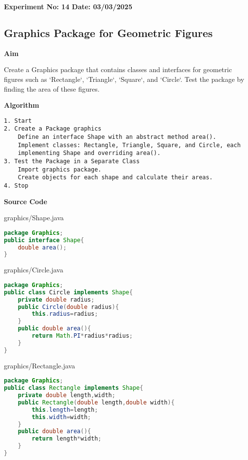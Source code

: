 \textbf{Experiment No: 14 \hfill Date: 03/03/2025}

\begin{center}
    \Large \subsection*{Graphics Package for Geometric Figures}
\end{center}

\textbf{Aim}
\vspace{0.5cm}

Create a Graphics package that contains classes and interfaces for geometric figures such as ‘Rectangle‘, ‘Triangle‘, ‘Square‘, and ‘Circle‘. Test the package by finding the area of these figures.

\vspace{0.5cm}
\textbf{Algorithm}
\vspace{0.5cm}
\begin{verbatim}
1. Start
2. Create a Package graphics
    Define an interface Shape with an abstract method area().
    Implement classes: Rectangle, Triangle, Square, and Circle, each 
    implementing Shape and overriding area().
3. Test the Package in a Separate Class
    Import graphics package.
    Create objects for each shape and calculate their areas.
4. Stop
\end{verbatim}

\vspace{0.5cm}
\textbf{Source Code}

graphics/Shape.java
\begin{lstlisting}[language=Java]
package Graphics;
public interface Shape{
	double area();
}
\end{lstlisting}

graphics/Circle.java
\begin{lstlisting}[language=Java]
package Graphics;
public class Circle implements Shape{
	private double radius;
	public Circle(double radius){
		this.radius=radius;
	}
	public double area(){
		return Math.PI*radius*radius;
	}
}
\end{lstlisting}

graphics/Rectangle.java
\begin{lstlisting}[language=Java]
package Graphics;
public class Rectangle implements Shape{
	private double length,width;
	public Rectangle(double length,double width){
		this.length=length;
		this.width=width;
	}
	public double area(){
		return length*width;
	}
}
\end{lstlisting}

